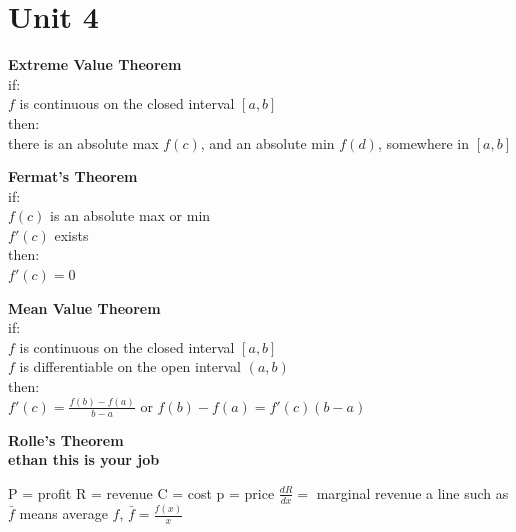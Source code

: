 \documentclass{article}
\begin{document}
\section*{Unit 4}
\begin{minipage}[t]{0.45\linewidth} 
    \textbf{Extreme Value Theorem} \\
    if: \\
    $f$ is continuous on the closed interval $[a, b]$ \\
    then: \\
    there is an absolute max $f(c)$, and an absolute min $f(d)$, somewhere in $[a, b]$ \\    
\end{minipage}
\hfill
\begin{minipage}[t]{0.45\linewidth}
    \textbf{Fermat's Theorem}\\
    if: \\
    $f(c)$ is an absolute max or min \\
    $f'(c)$ exists \\
    then: \\
    $f'(c) = 0$ \\    
\end{minipage}
\newline
\begin{minipage}[t]{0.45\linewidth}
    \textbf{Mean Value Theorem} \\
    if: \\
    $f$ is continuous on the closed interval $[a, b]$ \\
    $f$ is differentiable on the open interval $(a, b)$ \\
    then: \\
    $f'(c) = \frac{f(b)-f(a)}{b - a}$ or $f(b) - f(a) = f'(c)(b - a)$ \\   
\end{minipage}
\hfill
\begin{minipage}[t]{0.45\linewidth}
    \textbf{Rolle's Theorem} \\
    \textbf{ethan this is your job} \\    
\end{minipage}
\newline
P = profit  \hfill  R = revenue  \hfill  C = cost  \hfill  p = price   
\newline
    $\frac{dR}{dx}=$ marginal revenue
\newline
a line such as $\bar{f}$ means average $f$, $\bar{f}=\frac{f(x)}{x}$ 
\newpage
\end{document}
